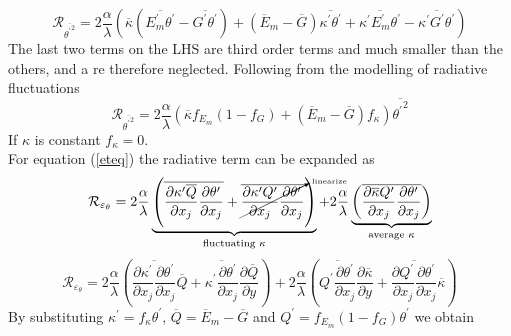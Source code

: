 \documentclass[10pt]{article}
\def\lp{\left(}
\def\rp{\right)}
\def\tp{\overline{{\theta^\prime}^2}}
\def\tr{{\theta^\prime}}
\def\et{{\varepsilon_{\theta}}}
\begin{document}
\begin{equation*}
\mathcal{R}_{\tp} = 2\frac{\alpha}{\lambda} \lp \overline{\kappa} (\overline{E_m^\prime \tr}-\overline{G^\prime \tr}) + (\overline{E}_m - \overline{G})\overline{\kappa^\prime \tr} + \overline{\kappa^\prime E_m^\prime \tr} - \overline{\kappa^\prime G^\prime \tr} \rp
\end{equation*}
The last two terms on the LHS are third order terms and much smaller than the others, and a re therefore neglected. Following from the modelling of radiative fluctuations
\begin{equation*}
\mathcal{R}_{\tp} = 2\frac{\alpha}{\lambda} \lp \overline{\kappa} f_{E_m}(1 - f_G ) + (\overline{E}_m - \overline{G})f_{\kappa} \rp \tp
\end{equation*}
If $\kappa$ is constant $f_{\kappa} = 0$.\\
For equation (\ref{eteq}) the radiative term can be expanded as
\begin{equation*}
\mathcal{R}_{\et} = 2\frac{\alpha}{\lambda} \underbrace{ \lp \overline{\frac{\partial \kappa^\prime \overline{Q}}{\partial x_j}\frac{\partial \tr}{\partial x_j}}+\cancelto{\text{\tiny{linearize}}}{\overline{\frac{\partial \kappa^\prime Q^\prime}{\partial x_j}\frac{\partial \tr}{\partial x_j}}}\rp}_{\text{fluctuating }\kappa } + 2\frac{\alpha}{\lambda} \underbrace{ \lp \overline{\frac{\partial \overline{\kappa} Q^\prime}{\partial x_j}\frac{\partial \tr}{\partial x_j}} \rp}_{\text{average } \kappa }  
\end{equation*}
\begin{equation*}
\mathcal{R}_{\et} = 2\frac{\alpha}{\lambda} \lp \overline{\frac{\partial \kappa^\prime}{\partial x_j}\frac{\partial \tr}{\partial x_j}}\overline{Q} +\overline{\kappa^\prime\frac{\partial \tr}{\partial x_j}} \frac{\partial \overline{Q}}{\partial y}\rp + 2\frac{\alpha}{\lambda} \lp \overline{ Q^\prime\frac{\partial \tr}{\partial x_j}}\frac{\partial \overline{\kappa}}{\partial y}  +
 \overline{\frac{\partial Q^\prime}{\partial x_j}\frac{\partial \tr}{\partial x_j}}\overline{\kappa} \rp  
\end{equation*}
By substituting $\kappa^\prime = f_{\kappa} \tr$, $\overline{Q} = \overline{E}_m - \overline{G}$ and $Q^\prime = f_{E_m}(1-f_G) \tr$ we obtain
\end{document}

